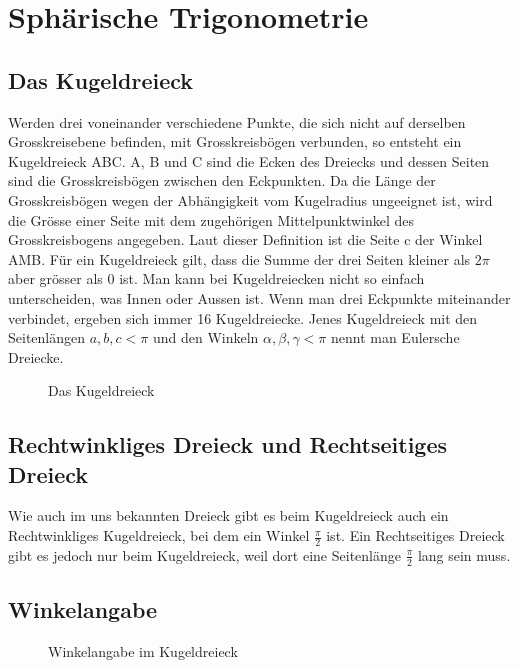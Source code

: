 \setlength{\parindent}{0em}
\section{Sphärische Trigonometrie}
\subsection{Das Kugeldreieck}

Werden drei voneinander verschiedene Punkte, die sich nicht auf derselben Grosskreisebene befinden, mit Grosskreisbögen verbunden, so entsteht ein Kugeldreieck ABC.
A, B und C sind die Ecken des Dreiecks und dessen Seiten sind die Grosskreisbögen zwischen den Eckpunkten. 
Da die Länge der Grosskreisbögen wegen der Abhängigkeit vom Kugelradius ungeeignet ist, wird die Grösse einer Seite mit dem zugehörigen Mittelpunktwinkel des Grosskreisbogens angegeben. 
Laut dieser Definition ist die Seite c der Winkel AMB. 
Für ein Kugeldreieck gilt, dass die Summe der drei Seiten kleiner als $2\pi$ aber grösser als 0 ist. 
Man kann bei Kugeldreiecken nicht so einfach unterscheiden, was Innen oder Aussen ist. 
Wenn man drei Eckpunkte miteinander verbindet, ergeben sich immer 16 Kugeldreiecke. 
Jenes Kugeldreieck mit den Seitenlängen $a, b, c < \pi$ und den Winkeln $\alpha, \beta, \gamma < \pi$ nennt man Eulersche Dreiecke.
\begin{figure}[h]
	\begin{center}
		\caption[Das Kugeldreieck]{Das Kugeldreieck}
	\end{center}
	
\end{figure}

\subsection{Rechtwinkliges Dreieck und Rechtseitiges Dreieck}
Wie auch im uns bekannten Dreieck gibt es beim Kugeldreieck auch ein Rechtwinkliges Kugeldreieck, bei dem ein Winkel $\frac{\pi}{2}$ ist. 
Ein Rechtseitiges Dreieck gibt es jedoch nur beim Kugeldreieck, weil dort eine Seitenlänge $\frac{\pi}{2}$ lang sein muss.
\newpage
\subsection{Winkelangabe}
\begin{figure}[h]
	
	\begin{center}
		\caption[Winkelangabe im Kugeldreieck]{Winkelangabe im Kugeldreieck}
	\end{center}	
\end{figure}


